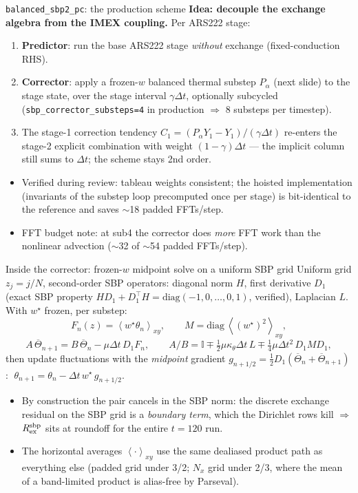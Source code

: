 \documentclass[aspectratio=169,10pt]{beamer}
\newcommand{\Tb}{\overline{\Theta}}
\newcommand{\avexy}[1]{\left\langle #1 \right\rangle_{xy}}
\begin{document}
\begin{frame}{\texttt{balanced\_sbp2\_pc}: the production scheme}
  \textbf{Idea: decouple the exchange algebra from the IMEX coupling.}
  Per ARS222 stage:
  \begin{enumerate}
    \item \textbf{Predictor}: run the base ARS222 stage \emph{without} exchange
      (fixed-conduction RHS).
    \item \textbf{Corrector}: apply a frozen-$w$ balanced thermal substep
      $P_\alpha$ (next slide) to the stage state, over the stage interval
      $\gamma\Delta t$, optionally subcycled (\texttt{sbp\_corrector\_substeps=4}
      in production $\Rightarrow$ 8 substeps per timestep).
    \item The stage-1 correction tendency $C_1 = (P_\alpha Y_1 - Y_1)/(\gamma\Delta t)$
      re-enters the stage-2 explicit combination with weight $(1-\gamma)\Delta t$
      --- the implicit column still sums to $\Delta t$; the scheme stays 2nd order.
  \end{enumerate}
  \begin{itemize}
    \item Verified during review: tableau weights consistent; the hoisted
      implementation (invariants of the substep loop precomputed once per stage)
      is bit-identical to the reference and saves $\sim$18 padded FFTs/step.
    \item FFT budget note: at sub4 the corrector does \emph{more} FFT work than the
      nonlinear advection ($\sim$32 of $\sim$54 padded FFTs/step).
  \end{itemize}
\end{frame}

\begin{frame}{Inside the corrector: frozen-$w$ midpoint solve on a uniform SBP grid}
  Uniform grid $z_j = j/N$, second-order SBP operators: diagonal norm $H$,
  first derivative $D_1$ (exact SBP property $HD_1 + D_1^{\!\top}H = \mathrm{diag}(-1,0,\dots,0,1)$,
  verified), Laplacian $L$. With $w^\star$ frozen, per substep:
  \[
    F_n(z) = \avexy{w^\star \theta_n}, \qquad
    M = \mathrm{diag}\,\avexy{(w^\star)^2},
  \]
  \[
    A\,\Tb_{n+1} = B\,\Tb_n - \mu\Delta t\, D_1 F_n,
    \qquad
    A/B = \mathbb{I} \mp \tfrac12\mu\kappa_\theta\Delta t\, L
      \mp \tfrac14 \mu \Delta t^2\, D_1 M D_1,
  \]
  then update fluctuations with the \emph{midpoint} gradient
  $g_{n+1/2} = \tfrac12 D_1(\Tb_n + \Tb_{n+1})$:
  \(
    \;\theta_{n+1} = \theta_n - \Delta t\, w^\star\, g_{n+1/2}.
  \)
  \begin{itemize}
    \item By construction the pair cancels in the SBP norm: the discrete exchange
      residual on the SBP grid is a \emph{boundary term}, which the Dirichlet rows
      kill $\Rightarrow$ $R_{\rm ex}^{\rm sbp}$ sits at roundoff for the entire
      $t=120$ run.
    \item The horizontal averages $\avexy{\cdot}$ use the same dealiased product path
      as everything else (padded grid under 3/2; $N_x$ grid under 2/3, where the
      mean of a band-limited product is alias-free by Parseval).
  \end{itemize}
\end{frame}
\end{document}
